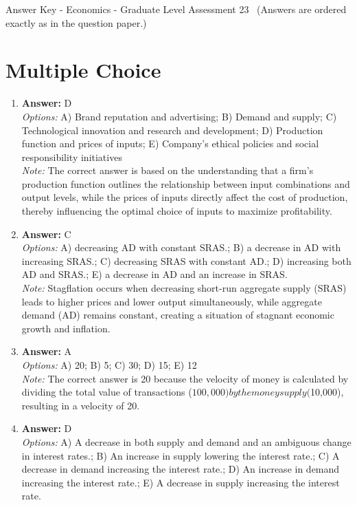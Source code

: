 \documentclass[12pt]{article}
\begin{document}
\begin{center}
Answer Key - Economics - Graduate Level Assessment 23 \
\small (Answers are ordered exactly as in the question paper.)
\end{center}

\section*{Multiple Choice}
\begin{enumerate}[label=\arabic*.]
\item \textbf{Answer:} D
\\ \textit{Options:} A) Brand reputation and advertising; B) Demand and supply; C) Technological innovation and research and development; D) Production function and prices of inputs; E) Company's ethical policies and social responsibility initiatives
\\ \textit{Note:} The correct answer is based on the understanding that a firm's production function outlines the relationship between input combinations and output levels, while the prices of inputs directly affect the cost of production, thereby influencing the optimal choice of inputs to maximize profitability.
\item \textbf{Answer:} C
\\ \textit{Options:} A) decreasing AD with constant SRAS.; B) a decrease in AD with increasing SRAS.; C) decreasing SRAS with constant AD.; D) increasing both AD and SRAS.; E) a decrease in AD and an increase in SRAS.
\\ \textit{Note:} Stagflation occurs when decreasing short-run aggregate supply (SRAS) leads to higher prices and lower output simultaneously, while aggregate demand (AD) remains constant, creating a situation of stagnant economic growth and inflation.
\item \textbf{Answer:} A
\\ \textit{Options:} A) 20; B) 5; C) 30; D) 15; E) 12
\\ \textit{Note:} The correct answer is 20 because the velocity of money is calculated by dividing the total value of transactions ($100,000) by the money supply ($10,000), resulting in a velocity of 20.
\item \textbf{Answer:} D
\\ \textit{Options:} A) A decrease in both supply and demand and an ambiguous change in interest rates.; B) An increase in supply lowering the interest rate.; C) A decrease in demand increasing the interest rate.; D) An increase in demand increasing the interest rate.; E) A decrease in supply increasing the interest rate.

\end{enumerate}
\end{document}
